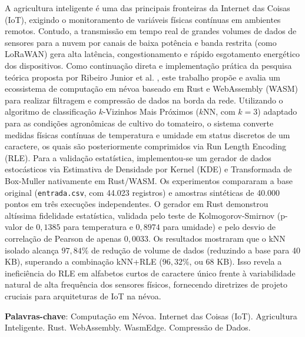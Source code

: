 \documentclass[
	12pt,
	openright,
	oneside,
	a4paper,
	english,
	brazil
	]{abntex2}
\begin{document}
\begin{resumo}
A agricultura inteligente é uma das principais fronteiras da Internet das Coisas (IoT), exigindo o monitoramento de variáveis físicas contínuas em ambientes remotos. Contudo, a transmissão em tempo real de grandes volumes de dados de sensores para a nuvem por canais de baixa potência e banda restrita (como LoRaWAN) gera alta latência, congestionamento e rápido esgotamento energético dos dispositivos. Como continuação direta e implementação prática da pesquisa teórica proposta por Ribeiro Junior et al. \cite{ribeiro2020nearest}, este trabalho propõe e avalia um ecossistema de computação em névoa baseado em Rust e WebAssembly (WASM) para realizar filtragem e compressão de dados na borda da rede. Utilizando o algoritmo de classificação $k$-Vizinhos Mais Próximos ($k$NN, com $k=3$) adaptado para as condições agronômicas de cultivo do tomateiro, o sistema converte medidas físicas contínuas de temperatura e umidade em status discretos de um caractere, os quais são posteriormente comprimidos via Run Length Encoding (RLE). Para a validação estatística, implementou-se um gerador de dados estocásticos via Estimativa de Densidade por Kernel (KDE) e Transformada de Box-Muller nativamente em Rust/WASM. Os experimentos compararam a base original (\texttt{entrada.csv}, com 44.023 registros) e amostras sintéticas de 40.000 pontos em três execuções independentes. O gerador em Rust demonstrou altíssima fidelidade estatística, validada pelo teste de Kolmogorov-Smirnov (p-valor de $0,1385$ para temperatura e $0,8974$ para umidade) e pelo desvio de correlação de Pearson de apenas $0,0033$. Os resultados mostraram que o kNN isolado alcança $97,84\%$ de redução de volume de dados (reduzindo a base para 40 KB), superando a combinação kNN+RLE ($96,32\%$, ou 68 KB). Isso revela a ineficiência do RLE em alfabetos curtos de caractere único frente à variabilidade natural de alta frequência dos sensores físicos, fornecendo diretrizes de projeto cruciais para arquiteturas de IoT na névoa.

\textbf{Palavras-chave}: Computação em Névoa. Internet das Coisas (IoT). Agricultura Inteligente. Rust. WebAssembly. WasmEdge. Compressão de Dados.
\end{resumo}
\end{document}
